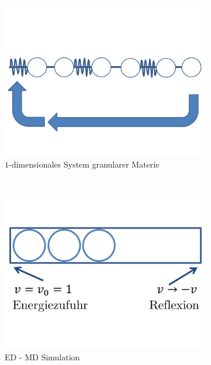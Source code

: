 \documentclass[12pt]{article}
\begin{document}
\begin{figure}[h] 
		\begin{subfigure}[h]{0.5 \textwidth}
		\centering
		\includegraphics[width=\textwidth]{Folie74.png}
		\caption{$1$-dimensionales System granularer Materie} 
		\label{fig:Granulat}
		\centering
	\end{subfigure}
	~
\begin{subfigure}[h]{0.5\textwidth}
		\centering
		\includegraphics[width=\textwidth]{Folie75.png}
		\caption{ED - MD Simulation}
		\label{fig:ED_MD}
		\centering
	\end{subfigure}
	\caption{}
\end{figure}	
\end{document}
